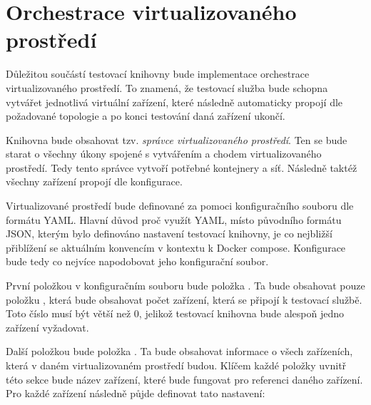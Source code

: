 \section{Orchestrace virtualizovaného prostředí}\label{sec:design_virt}

Důležitou součástí testovací knihovny bude implementace orchestrace virtualizovaného prostředí. To znamená, že testovací služba bude schopna vytvářet jednotlivá virtuální zařízení, které následně automaticky propojí dle požadované topologie a po konci testování daná zařízení ukončí. 

Knihovna bude obsahovat tzv. \textit{správce virtualizovaného prostředí}. Ten se bude starat o všechny úkony spojené s vytvářením a chodem virtualizovaného prostředí. Tedy tento správce vytvoří potřebné kontejnery a síť. Následně taktéž všechny zařízení propojí dle konfigurace. 

Virtualizované prostředí bude definované za pomoci konfiguračního souboru dle formátu YAML. Hlavní důvod proč využít YAML, místo původního formátu JSON, kterým bylo definováno nastavení testovací knihovny, je co nejbližší přiblížení se aktuálním konvencím v kontextu k Docker compose. Konfigurace bude tedy co nejvíce napodobovat jeho konfigurační soubor. 

První položkou v konfiguračním souboru bude položka . Ta bude obsahovat pouze položku , která bude obsahovat počet zařízení, která se připojí k testovací službě. Toto číslo musí být větší než 0, jelikož testovací knihovna bude alespoň jedno zařízení vyžadovat.

Další položkou bude položka . Ta bude obsahovat informace o všech zařízeních, která v daném virtualizovaném prostředí budou. Klíčem každé položky uvnitř této sekce bude název zařízení, které bude fungovat pro referenci daného zařízení. Pro každé zařízení následně půjde definovat tato nastavení: 

